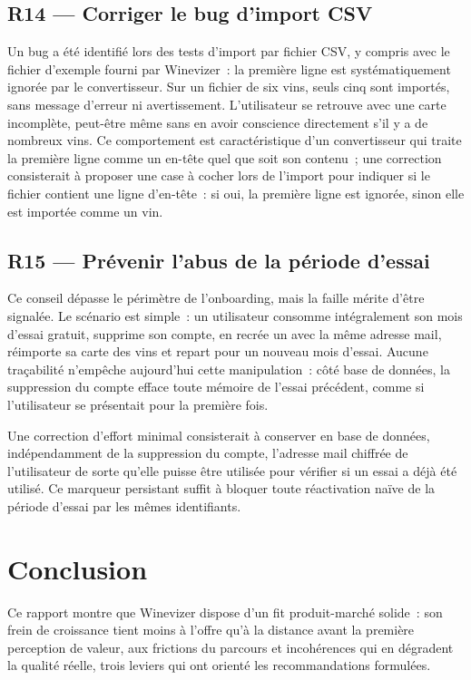 \documentclass[12pt, a4paper]{article}
\begin{document}
\subsection{R14 — Corriger le bug d'import CSV}

Un bug a été identifié lors des tests d'import par fichier CSV, y compris avec le fichier
d'exemple fourni par Winevizer~: la première ligne est systématiquement ignorée par le
convertisseur. Sur un fichier de six vins, seuls cinq sont importés, sans message d'erreur ni
avertissement. L'utilisateur se retrouve avec une carte incomplète, peut-être même
sans en avoir conscience directement s'il y a de nombreux vins.
Ce comportement est caractéristique d'un convertisseur qui traite la première ligne comme un
en-tête quel que soit son contenu~; une correction consisterait à proposer une case à cocher lors 
de l'import pour indiquer si le fichier contient une ligne d'en-tête~: si oui, 
la première ligne est ignorée, sinon elle est importée comme un vin.

\subsection{R15 — Prévenir l'abus de la période d'essai}

Ce conseil dépasse le périmètre de l'onboarding, mais la faille mérite d'être signalée.
Le scénario est simple~: un utilisateur consomme intégralement son mois d'essai gratuit,
supprime son compte, en recrée un avec la même adresse mail, réimporte sa carte des vins
et repart pour un nouveau mois d'essai. Aucune traçabilité n'empêche aujourd'hui cette
manipulation~: côté base de données, la suppression du compte efface toute mémoire de l'essai
précédent, comme si l'utilisateur se présentait pour la première fois.

Une correction d'effort minimal consisterait à conserver en base de données, indépendamment de la
suppression du compte, l'adresse mail chiffrée de l'utilisateur de sorte 
qu'elle puisse être utilisée pour vérifier si un essai a déjà été utilisé. 
Ce marqueur persistant suffit à bloquer toute réactivation
naïve de la période d'essai par les mêmes identifiants.

\section{Conclusion}

Ce rapport montre que Winevizer dispose d'un fit produit-marché solide~: son frein de
croissance tient moins à l'offre qu'à la distance avant la première perception de valeur, aux
frictions du parcours et incohérences qui en dégradent la qualité réelle, trois
leviers qui ont orienté les recommandations formulées.
\end{document}
